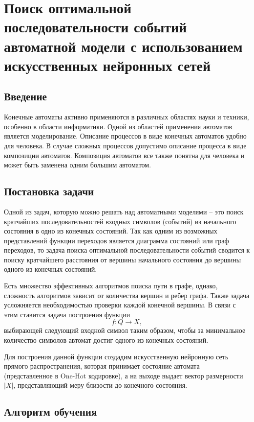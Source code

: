 \chapter{Поиск оптимальной последовательности событий автоматной модели с использованием искусственных нейронных сетей}
\section{Введение}
    Конечные автоматы активно применяются в различных областях науки и техники, особенно в области информатики.
    Одной из областей применения автоматов является моделирование\cite{AutomataProgam}.
    Описание процессов в виде конечных автоматов удобно для человека.
    В случае сложных процессов
    допустимо описание процесса в виде композиции автоматов\cite{AutoIntro}.
    Композиция автоматов все также понятна для человека и может быть
    заменена одним большим автоматом.


    \section{Постановка задачи}
    Одной из задач, которую можно решать над автоматными моделями -- это
    поиск кратчайших последовательностей входных символов (событий) из
    начального состояния в одно из конечных состояний. Так как одним из
    возможных представлений функции переходов является диаграмма состояний
    или граф переходов, то задача поиска оптимальной последовательности
    событий сводится к поиску кратчайшего расстояния от вершины начального
    состояния до вершины одного из конечных состояний.
    
    Есть множество эффективных алгоритмов поиска пути в графе, однако,
    сложность алгоритмов зависит от количества вершин и ребер графа. Также
    задача усложняется необходимостью проверки каждой конечной вершины. В
    связи с этим ставится задача построения функции $$f:Q \rightarrow X,$$
    выбирающей следующий входной символ таким образом, чтобы за минимальное
    количество символов автомат достиг одного из конечных состояний.
    
    Для построения данной функции создадим искусственную нейронную сеть
    прямого распространения, которая принимает состояние автомата
    (представленное в One-Hot кодировке), а на выходе выдает вектор
    размерности \(\left| X \right|\), представляющий меру близости до
    конечного состояния.
    
    \section{Алгоритм обучения}

